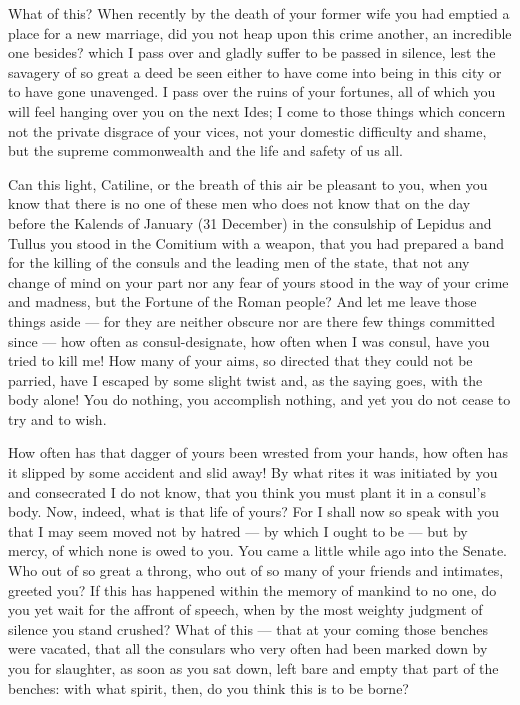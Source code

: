  What of this? When recently by the death of your former wife you had emptied a place for a new marriage, did you not heap upon this crime another, an incredible one besides? which I pass over and gladly suffer to be passed in silence, lest the savagery of so great a deed be seen either to have come into being in this city or to have gone unavenged. I pass over the ruins of your fortunes, all of which you will feel hanging over you on the next Ides; I come to those things which concern not the private disgrace of your vices, not your domestic difficulty and shame, but the supreme commonwealth and the life and safety of us all.

 Can this light, Catiline, or the breath of this air be pleasant to you, when you know that there is no one of these men who does not know that on the day before the Kalends of January (31 December) in the consulship of Lepidus and Tullus you stood in the Comitium with a weapon, that you had prepared a band for the killing of the consuls and the leading men of the state, that not any change of mind on your part nor any fear of yours stood in the way of your crime and madness, but the Fortune of the Roman people? And let me leave those things aside --- for they are neither obscure nor are there few things committed since --- how often as consul-designate, how often when I was consul, have you tried to kill me! How many of your aims, so directed that they could not be parried, have I escaped by some slight twist and, as the saying goes, with the body alone! You do nothing, you accomplish nothing, and yet you do not cease to try and to wish.

 How often has that dagger of yours been wrested from your hands, how often has it slipped by some accident and slid away! By what rites it was initiated by you and consecrated I do not know, that you think you must plant it in a consul's body. Now, indeed, what is that life of yours? For I shall now so speak with you that I may seem moved not by hatred --- by which I ought to be --- but by mercy, of which none is owed to you. You came a little while ago into the Senate. Who out of so great a throng, who out of so many of your friends and intimates, greeted you? If this has happened within the memory of mankind to no one, do you yet wait for the affront of speech, when by the most weighty judgment of silence you stand crushed? What of this --- that at your coming those benches were vacated, that all the consulars who very often had been marked down by you for slaughter, as soon as you sat down, left bare and empty that part of the benches: with what spirit, then, do you think this is to be borne?

